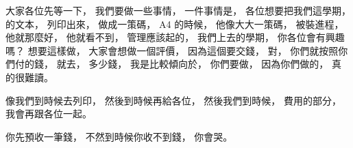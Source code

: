 \hypertarget{w02:cue:2897}{}大家各位先等一下，
\hypertarget{w02:cue:2898}{}我們要做一些事情，
\hypertarget{w02:cue:2899}{}一件事情是，
\hypertarget{w02:cue:2900}{}各位想要把我們這學期，
\hypertarget{w02:cue:2901}{}的文本，
\hypertarget{w02:cue:2902}{}列印出來，
\hypertarget{w02:cue:2903}{}做成一策碼，
\hypertarget{w02:cue:2904}{}A4 的時候，
\hypertarget{w02:cue:2905}{}他像大大一策碼，
\hypertarget{w02:cue:2906}{}被裝進程，
\hypertarget{w02:cue:2907}{}他就那麼好，
\hypertarget{w02:cue:2908}{}他就看不到，
\hypertarget{w02:cue:2909}{}管理應該起的，
\hypertarget{w02:cue:2910}{}我們上去的學期，
\hypertarget{w02:cue:2911}{}你各位會有興趣嗎？
\hypertarget{w02:cue:2912}{}想要這樣做，
\hypertarget{w02:cue:2913}{}大家會想做一個評價，
\hypertarget{w02:cue:2914}{}因為這個要交錢，
\hypertarget{w02:cue:2915}{}對，
\hypertarget{w02:cue:2916}{}你們就按照你們付的錢，
\hypertarget{w02:cue:2917}{}就去，
\hypertarget{w02:cue:2918}{}多少錢，
\hypertarget{w02:cue:2919}{}我是比較傾向於，
\hypertarget{w02:cue:2920}{}你們要做，
\hypertarget{w02:cue:2921}{}因為你們做的，
\hypertarget{w02:cue:2922}{}真的很難讀。

\hypertarget{w02:cue:2923}{}像我們到時候去列印，
\hypertarget{w02:cue:2924}{}然後到時候再給各位，
\hypertarget{w02:cue:2925}{}然後我們到時候，
\hypertarget{w02:cue:2926}{}費用的部分，
\hypertarget{w02:cue:2927}{}我會再跟各位一起。

\hypertarget{w02:cue:2928}{}你先預收一筆錢，
\hypertarget{w02:cue:2929}{}不然到時候你收不到錢，
\hypertarget{w02:cue:2930}{}你會哭。

